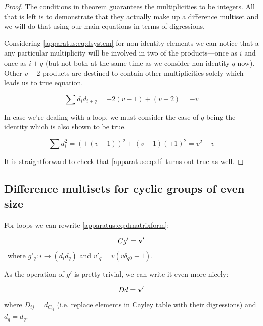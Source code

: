 \documentclass{article}
\theoremstyle{plain}
\theoremstyle{definition}
\theoremstyle{remark}
\begin{document}
            \begin{proof}
                The conditions in theorem guarantees the multiplicities to be integers. All that is left is to demonstrate that they actually make up a difference multiset and we will do that using our main equations in terms of digressions.
                
                Considering \eqref{apparatus:eq:dsystem} for non-identity elements we can notice that a any particular multiplicity will be involved in two of the products---once as $i$ and once as $i+q$ (but not both at the same time as we consider non-identity $q$ now). Other $v-2$ products are destined to contain other multiplicities solely which leads us to true equation.
                
                \begin{equation}
                    \sum d_i d_{i+q} = -2(v-1) + (v-2) = -v
                \end{equation}

                In case we're dealing with a loop, we must consider the case of $q$ being the identity which is also shown to be true.
                
                \begin{equation}
                    \sum d_i^2  = \left( \pm (v-1) \right)^2 + (v-1) \left( \mp 1 \right)^2 = v^2 - v
                \end{equation}
            
                It is straightforward to check that \eqref{apparatus:eq:di} turns out true as well.
            \end{proof}
        
        \subsection{Difference multisets for cyclic groups of even size}
            For loops we can rewrite \eqref{apparatus:eq:dmatrixform}:
            
            \begin{equation}
                C g' = \bf v'
            \end{equation}\
            where $g'_q: i \rightarrow (d_i d_q)$ and $v'_q = v(v\delta_{q0}-1)$.
            
            As the operation of $g'$ is pretty trivial, we can write it even more nicely:
            
            \begin{equation}
                D d = \bf v'
            \end{equation}
                where $D_{ij} = d_{C_{ij}}$ (i.e. replace elements in Cayley table with their digressions) and $d_q = d_q$.
\end{document}
